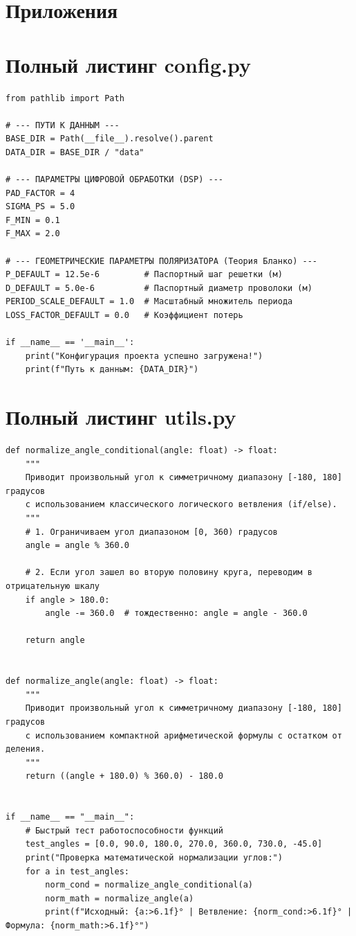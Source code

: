 \section*{Приложения}
\appendix

\section{Полный листинг config.py} \label{app:config}
\begin{verbatim}
from pathlib import Path

# --- ПУТИ К ДАННЫМ ---
BASE_DIR = Path(__file__).resolve().parent
DATA_DIR = BASE_DIR / "data"

# --- ПАРАМЕТРЫ ЦИФРОВОЙ ОБРАБОТКИ (DSP) ---
PAD_FACTOR = 4
SIGMA_PS = 5.0
F_MIN = 0.1
F_MAX = 2.0

# --- ГЕОМЕТРИЧЕСКИЕ ПАРАМЕТРЫ ПОЛЯРИЗАТОРА (Теория Бланко) ---
P_DEFAULT = 12.5e-6         # Паспортный шаг решетки (м)
D_DEFAULT = 5.0e-6          # Паспортный диаметр проволоки (м)
PERIOD_SCALE_DEFAULT = 1.0  # Масштабный множитель периода
LOSS_FACTOR_DEFAULT = 0.0   # Коэффициент потерь

if __name__ == '__main__':
    print("Конфигурация проекта успешно загружена!")
    print(f"Путь к данным: {DATA_DIR}")
\end{verbatim}

\section{Полный листинг utils.py} \label{app:utils}
\begin{verbatim}
def normalize_angle_conditional(angle: float) -> float:
    """
    Приводит произвольный угол к симметричному диапазону [-180, 180] градусов
    с использованием классического логического ветвления (if/else).
    """
    # 1. Ограничиваем угол диапазоном [0, 360) градусов
    angle = angle % 360.0
    
    # 2. Если угол зашел во вторую половину круга, переводим в отрицательную шкалу
    if angle > 180.0:
        angle -= 360.0  # тождественно: angle = angle - 360.0
        
    return angle


def normalize_angle(angle: float) -> float:
    """
    Приводит произвольный угол к симметричному диапазону [-180, 180] градусов
    с использованием компактной арифметической формулы с остатком от деления.
    """
    return ((angle + 180.0) % 360.0) - 180.0


if __name__ == "__main__":
    # Быстрый тест работоспособности функций
    test_angles = [0.0, 90.0, 180.0, 270.0, 360.0, 730.0, -45.0]
    print("Проверка математической нормализации углов:")
    for a in test_angles:
        norm_cond = normalize_angle_conditional(a)
        norm_math = normalize_angle(a)
        print(f"Исходный: {a:>6.1f}° | Ветвление: {norm_cond:>6.1f}° | Формула: {norm_math:>6.1f}°")
\end{verbatim}

